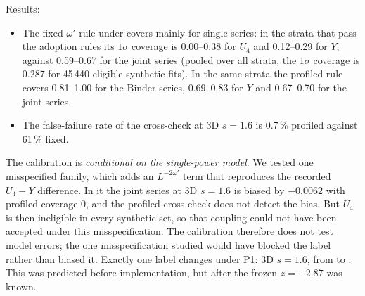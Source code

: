 Results:
\begin{itemize}
\item The fixed-$\omega'$ rule under-covers mainly for single series: in the strata that pass the adoption rules its $1\sigma$ coverage is
 0.00--0.38 for $U_4$ and 0.12--0.29 for $Y$, against 0.59--0.67 for the joint series (pooled over all strata, the $1\sigma$ coverage is 0.287 for
45\,440 eligible synthetic fits). In the same
 strata the profiled rule covers 0.81--1.00 for the Binder series, 0.69--0.83 for $Y$ and 0.67--0.70 for the joint series.
\item The false-failure rate of the cross-check at 3D $s=1.6$ is 0.7\,\% profiled against 61\,\% fixed.
\end{itemize}
The calibration is \emph{conditional on the single-power model}. We tested one misspecified family, which adds an $L^{-2\omega'}$ term that
reproduces the recorded $U_4-Y$ difference. In it the joint series at 3D $s=1.6$ is biased by $-0.0062$ with profiled coverage 0, and the
profiled cross-check does not detect the bias. But $U_4$ is then ineligible in every synthetic set, so that coupling could not have been
accepted under this misspecification.
The calibration therefore does not test model errors; the one misspecification studied would have blocked the label rather than biased it.
Exactly one label changes under P1: 3D $s=1.6$, from  to . This was predicted before implementation, but
after the frozen $z=-2.87$ was known.

